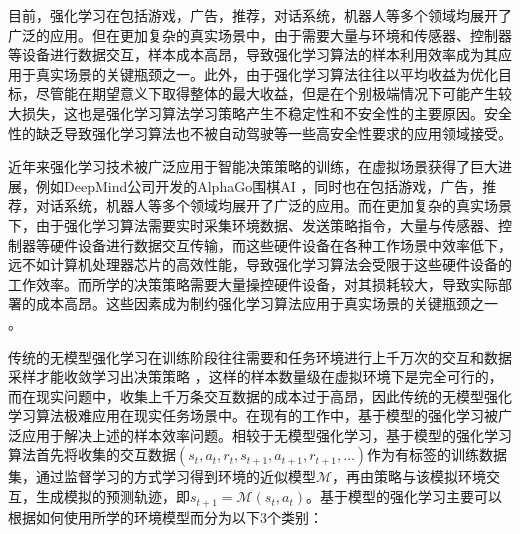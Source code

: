 



目前，强化学习在包括游戏，广告，推荐，对话系统，机器人等多个领域均展开了广泛的应用\cite{cai2017real,wang2018reinforcement,li2016deep,riedmiller2009reinforcement}。但在更加复杂的真实场景中，由于需要大量与环境和传感器、控制器等设备进行数据交互，样本成本高昂，导致强化学习算法的样本利用效率成为其应用于真实场景的关键瓶颈之一。此外，由于强化学习算法往往以平均收益为优化目标，尽管能在期望意义下取得整体的最大收益，但是在个别极端情况下可能产生较大损失，这也是强化学习算法学习策略产生不稳定性和不安全性的主要原因。安全性的缺乏导致强化学习算法也不被自动驾驶等一些高安全性要求的应用领域接受。

近年来强化学习技术被广泛应用于智能决策策略的训练，在虚拟场景获得了巨大进展，例如DeepMind公司开发的AlphaGo围棋AI \cite{chen2016evolution}，同时也在包括游戏，广告，推荐，对话系统，机器人等多个领域均展开了广泛的应用。而在更加复杂的真实场景下，由于强化学习算法需要实时采集环境数据、发送策略指令，大量与传感器、控制器等硬件设备进行数据交互传输，而这些硬件设备在各种工作场景中效率低下，远不如计算机处理器芯片的高效性能，导致强化学习算法会受限于这些硬件设备的工作效率\cite{zhang2021robust}。而所学的决策策略需要大量操控硬件设备，对其损耗较大，导致实际部署的成本高昂。这些因素成为制约强化学习算法应用于真实场景的关键瓶颈之一 \cite{arulkumaran2017deep,kober2013reinforcement}。

传统的无模型强化学习在训练阶段往往需要和任务环境进行上千万次的交互和数据采样才能收敛学习出决策策略 \cite{degris2012model}，这样的样本数量级在虚拟环境下是完全可行的，而在现实问题中，收集上千万条交互数据的成本过于高昂，因此传统的无模型强化学习算法极难应用在现实任务场景中。在现有的工作中，基于模型的强化学习被广泛应用于解决上述的样本效率问题\cite{osband2014model,moerland2020model}。相较于无模型强化学习，基于模型的强化学习算法首先将收集的交互数据$(s_t,a_t,r_t,s_{t+1},a_{t+1},r_{t+1},\ldots)$作为有标签的训练数据集，通过监督学习的方式学习得到环境的近似模型$\mathcal{M}$，再由策略与该模拟环境交互，生成模拟的预测轨迹，即$s_{t+1}=\mathcal{M}(s_t,a_t)$。基于模型的强化学习主要可以根据如何使用所学的环境模型而分为以下3个类别：

